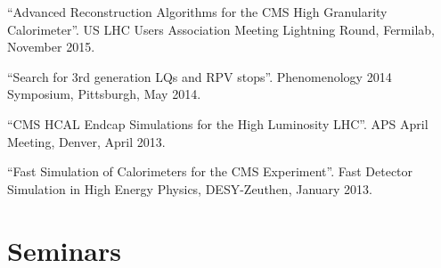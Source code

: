 \begin{description}[leftmargin=12pt,font=\normalfont,labelsep=0em]
\item ``Advanced Reconstruction Algorithms for the CMS High Granularity Calorimeter''. US LHC Users Association Meeting Lightning Round, Fermilab, November 2015.
\item ``Search for 3rd generation LQs and RPV stops''. Phenomenology 2014 Symposium, Pittsburgh, May 2014.
\item ``CMS HCAL Endcap Simulations for the High Luminosity LHC''. APS April Meeting, Denver, April 2013.
\item ``Fast Simulation of Calorimeters for the CMS Experiment''. Fast Detector Simulation in High Energy Physics, DESY-Zeuthen, January 2013.
\end{description}

\section{Seminars}
